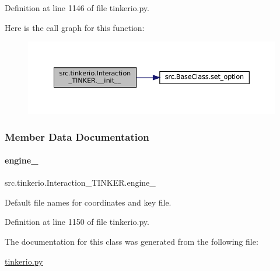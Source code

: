 Definition at line 1146 of file tinkerio.\+py.

Here is the call graph for this function\+:
\nopagebreak
\begin{figure}[H]
\begin{center}
\leavevmode
\includegraphics[width=350pt]{classsrc_1_1tinkerio_1_1Interaction__TINKER_afa64e6f9f9e073629086821ecb35bb66_cgraph}
\end{center}
\end{figure}


\subsubsection{Member Data Documentation}
\mbox{\label{classsrc_1_1tinkerio_1_1Interaction__TINKER_a16a2a97d6e2b945863fa37c163cbc67f}} 
\paragraph{\texorpdfstring{engine\+\_\+}{engine\_}}
{\footnotesize\ttfamily src.\+tinkerio.\+Interaction\+\_\+\+T\+I\+N\+K\+E\+R.\+engine\+\_\+}



Default file names for coordinates and key file. 



Definition at line 1150 of file tinkerio.\+py.



The documentation for this class was generated from the following file\+:\begin{DoxyCompactItemize}
\item 
\hyperlink{tinkerio_8py}{tinkerio.\+py}\end{DoxyCompactItemize}
